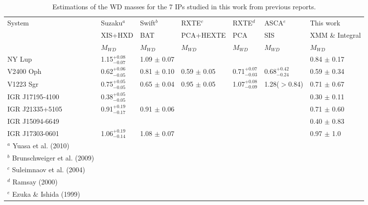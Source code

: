 \documentclass[oneside,a4paper,11pt]{report}
\begin{document}
\begin{table}
\begin{center}
\caption{Estimations of the WD masses for the 7 IPs studied in this work from previous reports.}
\begin{tabular}{lllllll}
\hline
\hline
System & Suzaku$^a$ & Swift$^b$ & RXTE$^c$ & RXTE$^d$ &  ASCA$^e$& This work  \\
       & XIS+HXD & BAT& PCA+HEXTE & PCA &  SIS & XMM \& Integral                     \\
       & $M_{WD}$ &$M_{WD}$ &$M_{WD} $&$M_{WD}$ &$M_{WD}$ &$M_{WD}$ \\
\hline
 NY Lup        & 1.15$^{+0.08}_{-0.07}$  & 1.09 $\pm$ 0.07      &          &     &               &  0.84 $\pm$ 0.17         \\
 V2400 Oph     & 0.62$^{+0.06}_{-0.05}$   &  0.81 $\pm$ 0.10      &  0.59 $\pm$ 0.05       &  0.71$^{+0.07}_{-0.03}$          &  0.68$^{+0.42}_{-0.24}$       &        0.59 $\pm$ 0.34   \\
 V1223 Sgr&     0.75$^{+0.05}_{-0.05}$    &0.65 $\pm$ 0.04        & 0.95 $\pm$ 0.05         & 1.07$^{+0.08}_{-0.09}$          &    1.28($>$0.84)      &         0.71 $\pm$ 0.67  \\
 IGR J17195-4100&  0.38$^{+0.05}_{-0.05}$       &        &          &     &               &     0.30 $\pm$ 0.11      \\
 IGR J21335+5105& 0.91$^{+0.19}_{-0.17}$  &    0.91 $\pm$ 0.06     &          &           &         &      0.71 $\pm$ 0.60     \\
 IGR J15094-6649&         &        &          &     &      &                0.40 $\pm$ 0.83   \\
 IGR J17303-0601&   1.06$^{+0.19}_{-0.14}$   & 1.08 $\pm$ 0.07       &          &     &      &                  0.97 $\pm$ 1.0  \\
\hline
\footnotesize
$^a$ Yuasa et al. (2010) &&&&&&\\
\footnotesize
$^b$ Brunschweiger et al. (2009) &&&&&&\\
\footnotesize
$^c$ Suleimnaov et al. (2004)&&&&&&\\
\footnotesize
$^d$ Ramsay (2000)&&&&&&\\
\footnotesize
$^e$ Ezuka \& Ishida (1999) &&&&&&\\
\hline
\end{tabular}
\label{p_mass}
\end{center}
\end{table}
\end{document}
